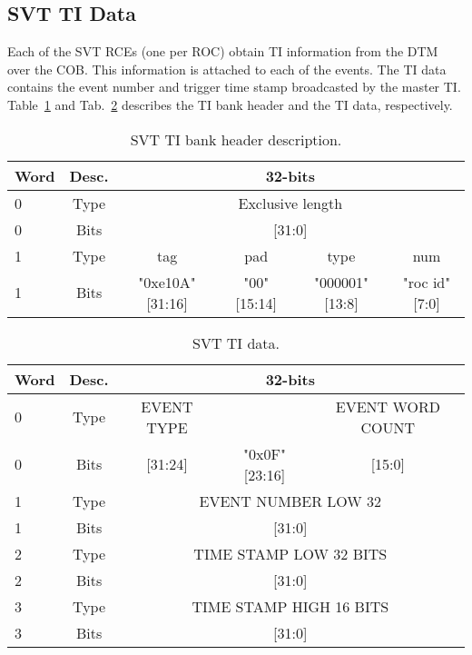 \documentclass{desyproc}
\begin{document}
\subsection{SVT TI Data}
\label{sec:svt-ti-data}
Each of the SVT RCEs (one per ROC) obtain TI information from the DTM over the COB. This information is 
attached to each of the events. The TI data contains the event number and trigger time stamp broadcasted by the 
master TI. Table~\ref{tab:svt-ti-header} and Tab.~\ref{tab:svt-ti-data} describes the TI bank header and the TI data, respectively.
\begin{table}[]
  \begin{center}
    \caption{SVT TI bank header description.}
    \label{tab:svt-ti-header}
    \begin{tabular}{|l|c|c|c|c|c|}
   	\hline
    	\bf Word & \bf Desc. & \multicolumn{4}{|c|}{\bf 32-bits}\\
      	\hline
    	 0 &  Type & \multicolumn{4}{|c|}{Exclusive length}\\
	\hline
    	 0 &  Bits & \multicolumn{4}{|c|}{[31:0]}\\
	\hline
    	 1 &  Type & tag & pad & type & num\\
	\hline
    	 1 &  Bits & "0xe10A" [31:16] & "00" [15:14] & "000001" [13:8] &  "roc id" [7:0]\\
	\hline
      \end{tabular}
  \end{center}
\end{table}


\begin{table}[]
  \begin{center}
    \caption{SVT TI  data.}
    \label{tab:svt-ti-data}
    \begin{tabular}{|l|c|c|c|c|}
   	\hline
    	\bf Word & \bf Desc. & \multicolumn{3}{|c|}{\bf 32-bits}\\
      	\hline
    	 0 &  Type & EVENT TYPE &  & EVENT WORD COUNT\\
	\hline
    	 0 &  Bits & [31:24] & "0x0F" [23:16] & [15:0]\\
	\hline
    	 1 &  Type & \multicolumn{3}{|c|}{ EVENT NUMBER LOW 32}\\
	\hline
    	 1 & Bits &  \multicolumn{3}{|c|}{ [31:0]}\\
	\hline
    	 2 &  Type & \multicolumn{3}{|c|}{ TIME STAMP LOW 32 BITS}\\
	\hline
    	 2 &  Bits & \multicolumn{3}{|c|}{ [31:0]}\\
	\hline
    	 3 &  Type & \multicolumn{3}{|c|}{ TIME STAMP HIGH 16 BITS}\\
	\hline
    	 3 &  Bits & \multicolumn{3}{|c|}{ [31:0]}\\
	\hline
      \end{tabular}
  \end{center}
\end{table}
\end{document}

